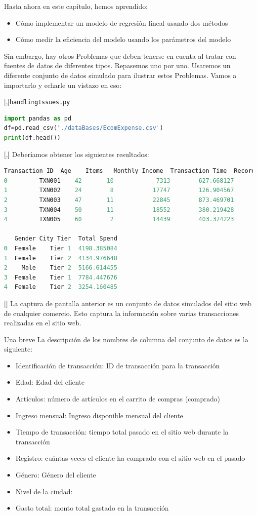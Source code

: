 Hasta ahora en este capítulo, hemos aprendido:
\begin{itemize}
 \item Cómo implementar un modelo de regresión lineal usando dos métodos
 \item Cómo medir la eficiencia del modelo usando los parámetros del modelo
\end{itemize}


Sin embargo, hay otros Problemas que deben tenerse en cuenta al tratar con fuentes de datos de diferentes tipos. Repasemos uno por uno. Usaremos un diferente conjunto de datos simulado para ilustrar estos Problemas. Vamos a importarlo y echarle un vistazo
en eso:

[,]{\texttt{handlingIssues.py}}
\begin{lstlisting}[language=Python]
import pandas as pd
df=pd.read_csv('./dataBases/EcomExpense.csv')
print(df.head())
\end{lstlisting}

[,]{}
Deberíamos obtener los siguientes resultados:
\tiny
\begin{lstlisting}[language=Python]
  Transaction ID  Age    Items   Monthly Income  Transaction Time  Record  \
0         TXN001    42       10            7313        627.668127       5
1         TXN002    24        8           17747        126.904567       3
2         TXN003    47       11           22845        873.469701       2
3         TXN004    50       11           18552        380.219428       7
4         TXN005    60        2           14439        403.374223       2

   Gender City Tier  Total Spend
0  Female    Tier 1  4198.385084
1  Female    Tier 2  4134.976648
2    Male    Tier 2  5166.614455
3  Female    Tier 1  7784.447676
4  Female    Tier 2  3254.160485
\end{lstlisting}

[]{}
La captura de pantalla anterior es un conjunto de datos simulados del sitio web de cualquier comercio. Esto captura la información sobre varias transacciones realizadas en el sitio web.


Una breve
La descripción de los nombres de columna del conjunto de datos es la siguiente:
\begin{itemize}
 \item Identificación de transacción: ID de transacción para la transacción
\item Edad: Edad del cliente
\item Artículos: número de artículos en el carrito de compras (comprado)
\item Ingreso mensual: Ingreso disponible mensual del cliente
\item Tiempo de transacción: tiempo total pasado en el sitio web durante la transacción
\item Registro: cuántas veces el cliente ha comprado con el sitio web en
el pasado
\item Género: Género del cliente
\item Nivel de la ciudad: ~
\item Gasto total: monto total gastado en la transacción
\end{itemize}



